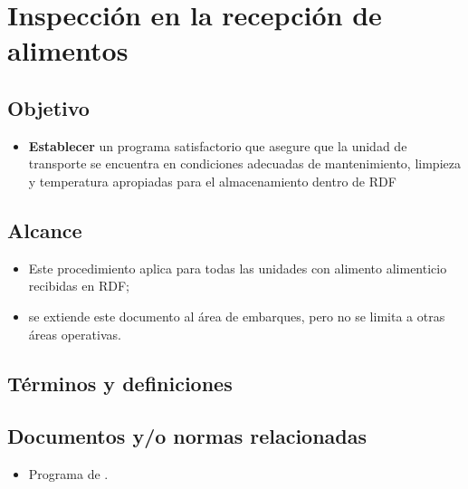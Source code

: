 \thispagestyle{formato-PI}
\renewcommand{\MayorVer}{2}
\renewcommand{\MenorVer}{1}
\renewcommand{\FechaPub}{2023--01}
\renewcommand{\TipoID}{PRO}
\renewcommand{\Titulo}{Inspección en la recepción de alimentos}

\section{\Titulo}
\renewcommand{\Codigo}{\Prog--\thesection--\TipoID}

\subsection{Objetivo}
\begin{itemize}
	\item \textbf{Establecer} un programa satisfactorio que asegure que la unidad de transporte se encuentra en condiciones adecuadas de mantenimiento, limpieza y temperatura apropiadas para el almacenamiento dentro de \gls{RDF}
\end{itemize}

\subsection{Alcance}
\begin{itemize}
	\item Este procedimiento aplica para todas las unidades con alimento alimenticio recibidas en RDF;
	\item se extiende este documento al área de embarques, pero no se limita a otras áreas operativas.
\end{itemize}

\subsection{Términos y definiciones}
\begin{description}
\end{description}

\subsection{Documentos y/o normas relacionadas}
\begin{itemize}
	\item Programa de .
\end{itemize}

